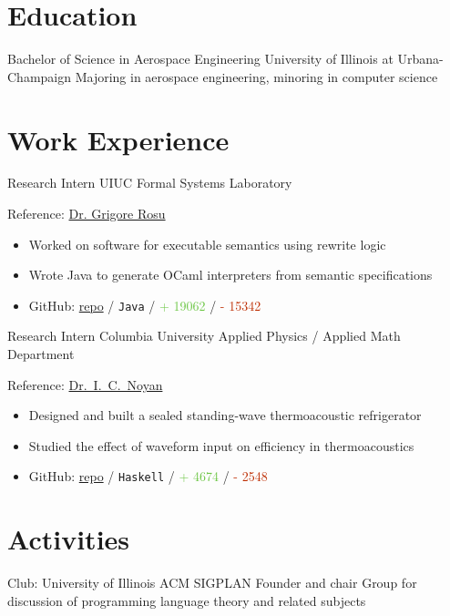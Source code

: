 \documentclass[10pt,letterpaper,sans]{moderncv}
\newcommand{\wlink}[2]{\textcolor[HTML]{0071E6}{\href{#1}{#2}}}
\newcommand{\ghlink}[2]{\wlink{https://github.com/#1}{#2}}
\newcommand{\ghrepo}[1]{\ghlink{#1}{repo}}
\newcommand{\ghlang}[1]{\texttt{#1}}
\newcommand{\ghadd}[1]{\textcolor[HTML]{6CC644}{+ #1}}
\newcommand{\ghrem}[1]{\textcolor[HTML]{BD2C00}{- #1}}
\newcommand{\ghub}[4]{GitHub: \ghrepo{#2} / \ghlang{#1} / \ghadd{#3} / \ghrem{#4}}
\begin{document}
\makecvtitle

\section{Education}
        {Bachelor of Science in Aerospace Engineering}
        {University of Illinois at Urbana-Champaign}
        {}{}
        {Majoring in aerospace engineering, minoring in computer science}

\section{Work Experience}
        {Research Intern}
        {UIUC Formal Systems Laboratory}
        {}{}{
Reference: \href{http://tinyurl.com/grigore-rosu}{Dr. Grigore Rosu}
\begin{itemize}
\item Worked on software for executable semantics using rewrite logic
\item Wrote Java to generate OCaml interpreters from semantic specifications
\item \ghub{Java}{taktoa/k}{19062}{15342}
\end{itemize}
}

        {Research Intern}
        {Columbia University Applied Physics / Applied Math Department}
        {}{}{
Reference: \href{http://tinyurl.com/i-cevdet-noyan}{Dr.\ I.\ C.\ Noyan}
\begin{itemize}
\item Designed and built a sealed standing-wave thermoacoustic refrigerator
\item Studied the effect of waveform input on efficiency in thermoacoustics
\item \ghub{Haskell}{taktoa/ThermoCalc}{4674}{2548}
\end{itemize}
}
      

\section{Activities}
        {Club: University of Illinois ACM SIGPLAN}
        {Founder and chair}
        {}{}{
  Group for discussion of programming language theory and related subjects
}
\end{document}
